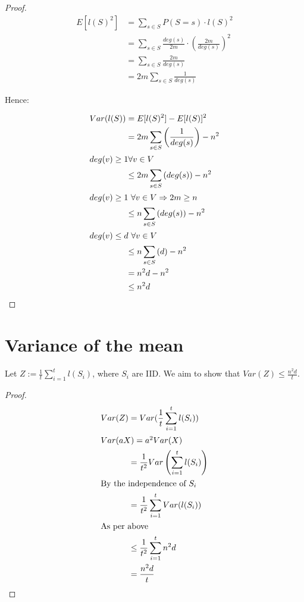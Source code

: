 \documentclass[a4paper]{scrreprt}
\begin{document}
\begin{proof}
  \begin{align*}
    E[l(S)^2] & = \sum_{s \in S}{P(S = s) \cdot l(S)^2} \\
    & = \sum_{s \in S}{\frac{deg(s)}{2m} \cdot \left(\frac{2m}{deg(s)}\right)^2} \\
    & = \sum_{s \in S}{\frac{2m}{deg(s)}} \\
    & = 2m \sum_{s \in S}{\frac{1}{deg(s)}}
  \end{align*}

  Hence:

  \begin{align*}
    Var(l(S)) & = E[l(S)^2] - E[l(S)]^2 \\
              & = 2m \sum_{s \in S}{\left(\frac{1}{deg(s)}\right)} - n^2 \\
    \intertext{$deg(v) \geq 1 \forall v \in V$}
    & \leq 2m \sum_{s \in S}{(deg(s))} - n^2 \\
    \intertext{$deg(v) \geq 1\ \forall v \in V \Rightarrow 2m \geq n$}
    & \leq n \sum_{s \in S}{(deg(s))} - n^2 \\
    \intertext{$deg(v) \leq d\ \forall v \in V$}
    & \leq n \sum_{s \in S}{(d)} - n^2 \\
    & = n^2 d - n^2 \\
    & \leq n^2 d
  \end{align*}
\end{proof}

\section{Variance of the mean}

Let $Z := \frac{1}{t} \sum_{i=1}^t{l(S_i)}$, where $S_i$ are IID. We aim to
show that $Var(Z) \leq \frac{n^2 d}{t}$.

\begin{proof}
  \begin{align*}
    Var(Z) & = Var(\frac{1}{t} \sum_{i=1}^t{l(S_i)}) \\
    \intertext{$Var(aX) = a^2 Var(X)$}
    & = \frac{1}{t^2} Var\left(\sum_{i=1}^t{l(S_i)}\right) \\
    \intertext{By the independence of $S_i$}
    & = \frac{1}{t^2} \sum_{i=1}^t{Var(l(S_i))} \\
    \intertext{As per above}
    & \leq \frac{1}{t^2} \sum_{i=1}^t{n^2 d} \\
    & = \frac{n^2 d}{t}
  \end{align*}
\end{proof}
\end{document}
